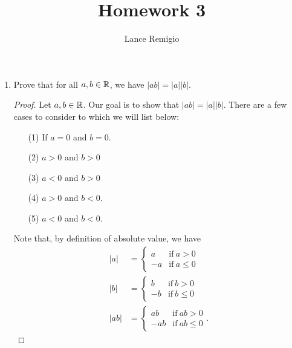 \documentclass{article}
\title{Homework 3}
\author{Lance Remigio}
\begin{document}
\maketitle    

\rhead{\thepage}



\begin{enumerate}
    \item Prove that for all \( a,b \in \mathbb{R}  \), we have \( | ab |  = | a |  | b |  \).
        \begin{proof}
        Let \( a,b \in \mathbb{R}  \). Our goal is to show that \( | ab | = | a |  | b |   \). There are a few cases to consider to which we will list below:
        \begin{enumerate}
            \item[(1)] If \( a = 0  \) and \( b = 0  \).
            \item[(2)] \( a > 0  \) and \(  b > 0  \) 
            \item[(3)] \( a < 0  \) and \( b > 0  \)  
            \item[(4)] \( a > 0  \) and \( b < 0  \).
            \item[(5)] \( a < 0  \) and \( b < 0 \).
        \end{enumerate}
        Note that, by definition of absolute value, we have
        \begin{align*}
            | a  | &= 
            \begin{cases}
                a &\text{if} \ a > 0 \\
                -a &\text{if} \ a \leq 0
            \end{cases}    \\
            | b  | &= 
            \begin{cases}
                b &\text{if} \ b > 0 \\
                -b &\text{if} \ b \leq 0
            \end{cases}    \\
            | ab  | &= 
            \begin{cases}
                ab &\text{if} \ ab > 0 \\
                -ab &\text{if} \ ab \leq 0
            \end{cases}. 
        \end{align*}


\end{proof}
\end{enumerate}
\end{document}
